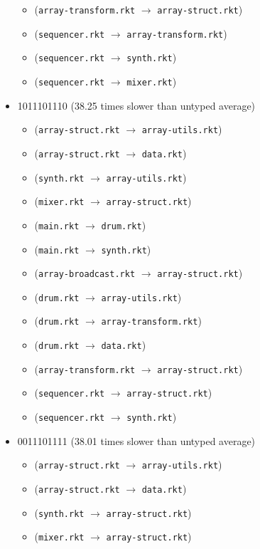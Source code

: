 \documentclass{article}
\newcommand{\mono}[1]{\texttt{#1}}
\begin{document}
\begin{itemize}
\begin{itemize}
  \item (\mono{array-transform.rkt} $\rightarrow$ \mono{array-struct.rkt})
  \item (\mono{sequencer.rkt} $\rightarrow$ \mono{array-transform.rkt})
  \item (\mono{sequencer.rkt} $\rightarrow$ \mono{synth.rkt})
  \item (\mono{sequencer.rkt} $\rightarrow$ \mono{mixer.rkt})
  \end{itemize}
\item 1011101110 (38.25 times slower than untyped average)
  \begin{itemize}
  \item (\mono{array-struct.rkt} $\rightarrow$ \mono{array-utils.rkt})
  \item (\mono{array-struct.rkt} $\rightarrow$ \mono{data.rkt})
  \item (\mono{synth.rkt} $\rightarrow$ \mono{array-utils.rkt})
  \item (\mono{mixer.rkt} $\rightarrow$ \mono{array-struct.rkt})
  \item (\mono{main.rkt} $\rightarrow$ \mono{drum.rkt})
  \item (\mono{main.rkt} $\rightarrow$ \mono{synth.rkt})
  \item (\mono{array-broadcast.rkt} $\rightarrow$ \mono{array-struct.rkt})
  \item (\mono{drum.rkt} $\rightarrow$ \mono{array-utils.rkt})
  \item (\mono{drum.rkt} $\rightarrow$ \mono{array-transform.rkt})
  \item (\mono{drum.rkt} $\rightarrow$ \mono{data.rkt})
  \item (\mono{array-transform.rkt} $\rightarrow$ \mono{array-struct.rkt})
  \item (\mono{sequencer.rkt} $\rightarrow$ \mono{array-struct.rkt})
  \item (\mono{sequencer.rkt} $\rightarrow$ \mono{synth.rkt})
  \end{itemize}
\item 0011101111 (38.01 times slower than untyped average)
  \begin{itemize}
  \item (\mono{array-struct.rkt} $\rightarrow$ \mono{array-utils.rkt})
  \item (\mono{array-struct.rkt} $\rightarrow$ \mono{data.rkt})
  \item (\mono{synth.rkt} $\rightarrow$ \mono{array-struct.rkt})
  \item (\mono{mixer.rkt} $\rightarrow$ \mono{array-struct.rkt})

\end{itemize}
\end{itemize}
\end{document}
